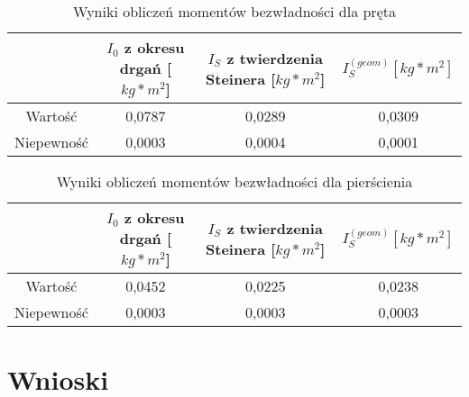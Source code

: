 \documentclass[a4paper,10pt,twoside]{article}
\begin{document}
\begin{table}[h]
	\caption{Wyniki obliczeń momentów bezwładności dla pręta}
 	\begin{tabular}[hb]{|c|c|c|c|}
 		\hline
 		& $I_0$ z okresu drgań [$kg*m^2$] & $I_S$ z twierdzenia Steinera [$kg*m^2$]& $I_S^{(geom)} [kg*m^2]$ \\ \hline
 		Wartość&0,0787&0,0289&0,0309 \\ \hline
 		Niepewność&0,0003&0,0004&0,0001 \\ \hline
 	\end{tabular}
\end{table}

\begin{table}[h]
	\caption{Wyniki obliczeń momentów bezwładności dla pierścienia}
	\begin{tabular}[hb]{|c|c|c|c|}
		\hline
		& $I_0$ z okresu drgań [$kg*m^2$] & $I_S$ z twierdzenia Steinera [$kg*m^2$]& $I_S^{(geom)} [kg*m^2]$ \\ \hline
		Wartość&0,0452&0,0225&0,0238 \\ \hline
		Niepewność&0,0003&0,0003&0,0003 \\ \hline
	\end{tabular}
\end{table}
	\section{Wnioski}
\end{document}
